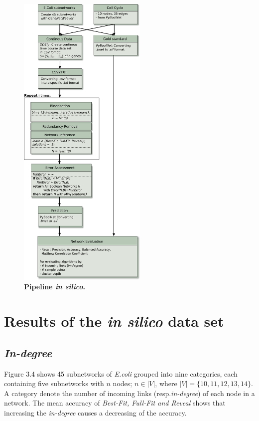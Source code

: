 \begin{figure}[H]
\centering
\includegraphics[width=0.55\textwidth]{./Bilder/pipeline_insilico.pdf}
\caption[\textit{In silico} Pipeline]{\textbf{Pipeline \textit{in silico}.}}
\label{fig:9}
\end{figure}



\section{Results of the \textit{in silico} data set}
\subsection*{\textit{In-degree}}
Figure 3.4 shows 45 subnetworks of \textit{E.coli} grouped into nine categories, each containing five subnetworks with $n$ nodes; $n\in |V|$, where $|V|=\{10,11,12,13,14\}$. A category denote the number of incoming links (resp.\textit{in-degree}) of each node in a network. The mean accuracy of \textit{Best-Fit, Full-Fit and Reveal} shows that increasing the \textit{in-degree} causes a decreasing of the accuracy. 

